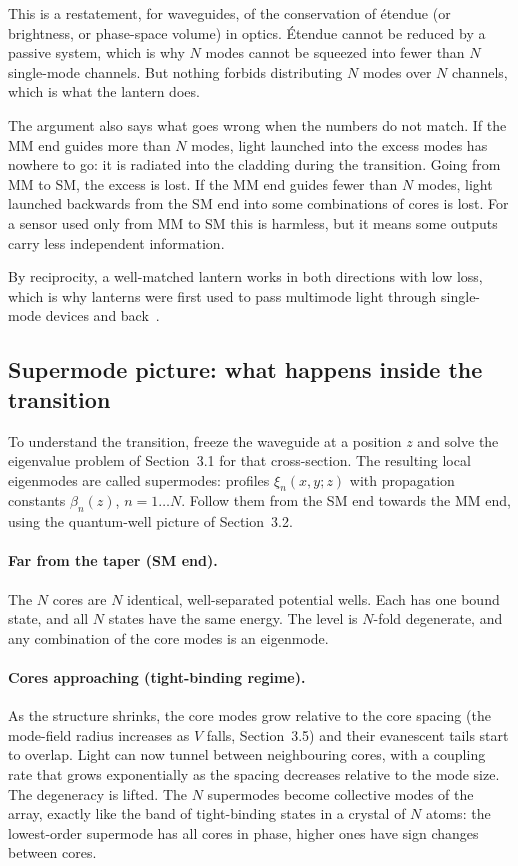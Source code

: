 \documentclass[11pt,a4paper]{article}
\begin{document}
This is a restatement, for waveguides, of the conservation of \'etendue (or brightness, or phase-space volume) in optics. \'Etendue cannot be reduced by a passive system, which is why $N$ modes cannot be squeezed into fewer than $N$ single-mode channels. But nothing forbids distributing $N$ modes over $N$ channels, which is what the lantern does.

The argument also says what goes wrong when the numbers do not match. If the MM end guides more than $N$ modes, light launched into the excess modes has nowhere to go: it is radiated into the cladding during the transition. Going from MM to SM, the excess is lost. If the MM end guides fewer than $N$ modes, light launched backwards from the SM end into some combinations of cores is lost. For a sensor used only from MM to SM this is harmless, but it means some outputs carry less independent information.

By reciprocity, a well-matched lantern works in both directions with low loss, which is why lanterns were first used to pass multimode light through single-mode devices and back~\cite{LeonSaval2005}.

\subsection{Supermode picture: what happens inside the transition}
To understand the transition, freeze the waveguide at a position $z$ and solve the eigenvalue problem of Section~3.1 for that cross-section. The resulting local eigenmodes are called supermodes: profiles $\xi_n(x,y;z)$ with propagation constants $\beta_n(z)$, $n = 1\ldots N$. Follow them from the SM end towards the MM end, using the quantum-well picture of Section~3.2.

\paragraph{Far from the taper (SM end).} The $N$ cores are $N$ identical, well-separated potential wells. Each has one bound state, and all $N$ states have the same energy. The level is $N$-fold degenerate, and any combination of the core modes is an eigenmode.

\paragraph{Cores approaching (tight-binding regime).} As the structure shrinks, the core modes grow relative to the core spacing (the mode-field radius increases as $V$ falls, Section~3.5) and their evanescent tails start to overlap. Light can now tunnel between neighbouring cores, with a coupling rate that grows exponentially as the spacing decreases relative to the mode size. The degeneracy is lifted. The $N$ supermodes become collective modes of the array, exactly like the band of tight-binding states in a crystal of $N$ atoms: the lowest-order supermode has all cores in phase, higher ones have sign changes between cores.
\end{document}
